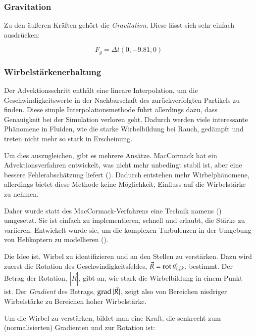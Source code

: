 \subsubsection{Gravitation}

Zu den äußeren Kräften gehört die \emph{Gravitation}. Diese lässt sich
sehr einfach ausdrücken:

\begin{equation}
F_g = \Delta t (0,-9.81,0)
\end{equation}

\subsubsection{Wirbelstärkenerhaltung}

Der Advektionsschritt enthält eine lineare Interpolation, um die
Geschwindigkeitswerte in der Nachbarschaft des zurückverfolgten Partikels zu
finden. Diese simple Interpolationsmethode führt allerdings dazu, dass
Genauigkeit bei der Simulation verloren geht. Dadurch werden viele interessante
Phänomene in Fluiden, wie die starke Wirbelbildung bei Rauch, gedämpft und
treten nicht mehr so stark in Erscheinung.

Um dies auszugleichen, gibt es mehrere Ansätze. MacCormack hat ein
Advektionsverfahren entwickelt, was nicht mehr unbedingt stabil ist, aber eine
bessere Fehlerabschätzung liefert (\cite{Selle2008, Crane2007}). Dadurch
entstehen mehr Wirbelphänomene, allerdings bietet diese Methode keine
Möglichkeit, Einfluss auf die Wirbelstärke zu nehmen.

Daher wurde statt des MacCormack-Verfahrens eine Technik namens
 () umgesetzt. Sie ist einfach zu implementieren, schnell
und erlaubt, die Stärke zu variieren. Entwickelt wurde sie, um die
komplexen Turbulenzen in der Umgebung von Helikoptern zu
modellieren (\cite{Steinhoff1994}).

Die Idee ist, Wirbel zu identifizieren und an den 
Stellen zu verstärken. Dazu wird zuerst die Rotation des Geschwindigkeitsfeldes,
$\vec{R} = \operatorname*{rot} \vec{u}_{i,j,k}$, bestimmt. Der Betrag der Rotation,
$|\vec{R}|$, gibt an, wie stark die Wirbelbildung in einem Punkt ist. Der
\emph{Gradient} des Betrags, $\operatorname*{grad} |\vec{R}|$, zeigt also
von Bereichen niedriger Wirbelstärke zu Bereichen hoher Wirbelstärke.

Um die Wirbel zu verstärken, bildet man eine Kraft, die senkrecht zum
(normalisierten) Gradienten und zur Rotation ist:


